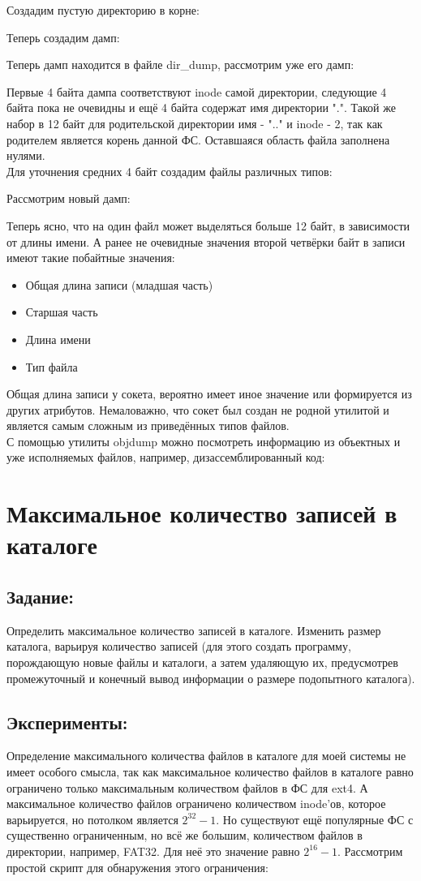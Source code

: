 \documentclass[a4paper]{article}
\begin{document}
\noindent Создадим пустую директорию в корне:

Теперь создадим дамп:

Теперь дамп находится в файле dir\_dump, рассмотрим уже его дамп:

Первые 4 байта дампа соответствуют inode самой директории, следующие 4 байта пока не очевидны и ещё 4 байта содержат имя директории ".". Такой же набор в 12 байт для родительской директории имя - ".." и inode - 2, так как родителем является корень данной ФС. Оставшаяся область файла заполнена нулями.\\
Для уточнения средних 4 байт создадим файлы различных типов:

Рассмотрим новый дамп:

Теперь ясно, что на один файл может выделяться больше 12 байт, в зависимости от длины имени. А ранее не очевидные значения второй четвёрки байт в записи имеют такие побайтные значения:
\begin{itemize}
\item Общая длина записи (младшая часть)
\item Старшая часть
\item Длина имени
\item Тип файла
\end{itemize}
Общая длина записи у сокета, вероятно имеет иное значение или формируется из других атрибутов. Немаловажно, что сокет был создан не родной утилитой и является самым сложным из приведённых типов файлов.\\

С помощью утилиты objdump можно посмотреть информацию из объектных и уже исполняемых файлов, например, дизассемблированный код:


\section{Максимальное количество записей в каталоге}
\subsection{Задание:} Определить максимальное количество записей в каталоге. 
Изменить размер каталога, варьируя количество записей (для этого создать программу, порождающую новые файлы и каталоги, а затем удаляющую их, предусмотрев промежуточный и конечный вывод информации о размере подопытного каталога). 

\subsection{Эксперименты:}
Определение максимального количества файлов в каталоге для моей системы не имеет особого смысла, так как максимальное количество файлов в каталоге равно ограничено только максимальным количеством файлов в ФС для ext4. А максимальное количество файлов ограничено количеством inode'ов, которое варьируется, но потолком является $2^{32}-1$. Но существуют ещё популярные ФС с существенно ограниченным, но всё же большим, количеством файлов в директории, например, FAT32. Для неё это значение равно $2^{16}-1$. Рассмотрим простой скрипт для обнаружения этого ограничения:
\end{document}

